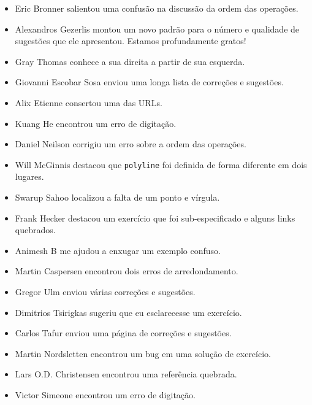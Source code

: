 \documentclass[10pt]{book}
\begin{document}
\begin {itemize}
\item Eric Bronner salientou uma confusão na discussão da
ordem das operações.

\item Alexandros Gezerlis montou um novo padrão para o número e
qualidade de sugestões que ele apresentou. Estamos profundamente gratos!

\item Gray Thomas conhece a sua direita a partir de sua esquerda.

\item Giovanni Escobar Sosa enviou uma longa lista de correções e
sugestões.

\item Alix Etienne consertou uma das URLs.

\item Kuang He encontrou um erro de digitação.

\item Daniel Neilson corrigiu um erro sobre a ordem das operações.

\item Will McGinnis destacou que {\tt polyline} foi definida
de forma diferente em dois lugares.

\item Swarup Sahoo localizou a falta de um ponto e vírgula.

\item Frank Hecker destacou um exercício que foi sub-especificado e
alguns links quebrados.

\item Animesh B me ajudou a enxugar um exemplo confuso.

\item Martin Caspersen encontrou dois erros de arredondamento.

\item Gregor Ulm enviou várias correções e sugestões.

\item Dimitrios Tsirigkas sugeriu que eu esclarecesse um exercício.

\item Carlos Tafur enviou uma página de correções e sugestões.

\item Martin Nordsletten encontrou um bug em uma solução de exercício.

\item Lars O.D. Christensen encontrou uma referência quebrada.

\item Victor Simeone encontrou um erro de digitação.


\end{itemize}
\end{document}
